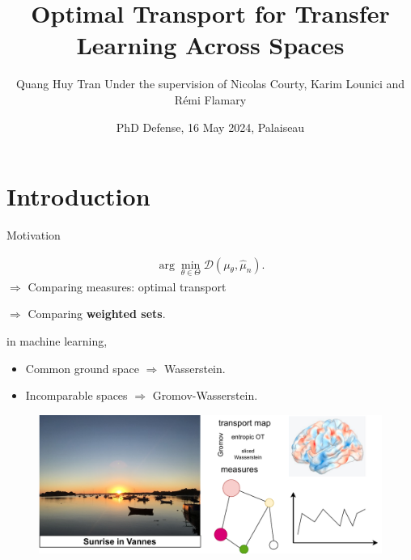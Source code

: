 \documentclass{beamer}
\title[PhD Defense]{Optimal Transport for Transfer Learning Across Spaces}
\author[]{Quang Huy Tran \break \scriptsize{Under the supervision of Nicolas Courty, Karim Lounici and Rémi Flamary}}
\institute[] %
{
  \inst{1}%
  Institut de Recherche en Informatique et Systèmes Aléatoires - IRISA \\
  Université Bretagne Sud
  \and
  \inst{2}%
  Centre de Mathématiques Appliquées - CMAP \\
  Ecole Polytechnique
}
\date[] %
{PhD Defense, 16 May 2024, Palaiseau}
\begin{document}
\frame{\titlepage}


\section{Introduction}
\begin{frame}{Motivation}
\scriptsize

\begin{minipage}[t]{0.6\linewidth}
  {\color{brown}{Density fitting:}}
  \vspace{-0.7cm}
  \begin{align*}
    \arg\min_{\theta \in \Theta} \mathcal D(\mu_{\theta}, \widehat{\mu}_n).
  \end{align*}
  $\Rightarrow$ Comparing measures: optimal transport

  $\Rightarrow$ Comparing \textbf{weighted sets}.

  \vspace{0.4cm}
  {\color{brown}{Folks say:}} in machine learning,
  \begin{itemize}
    \item Common ground space $\Rightarrow$ Wasserstein.
    \item Incomparable spaces $\Rightarrow$ Gromov-Wasserstein.
  \end{itemize}

  \end{minipage}%
  \hfill%
  \hspace{-6cm}
  \begin{minipage}[t]{0.49\linewidth}
    \vspace{-0.2cm}
  \begin{figure}
    \centering
    \includegraphics[width=1.15\linewidth, keepaspectratio=true]{OT_new/appli.pdf}
  \end{figure}
  \end{minipage}


\end{frame}
\end{document}
